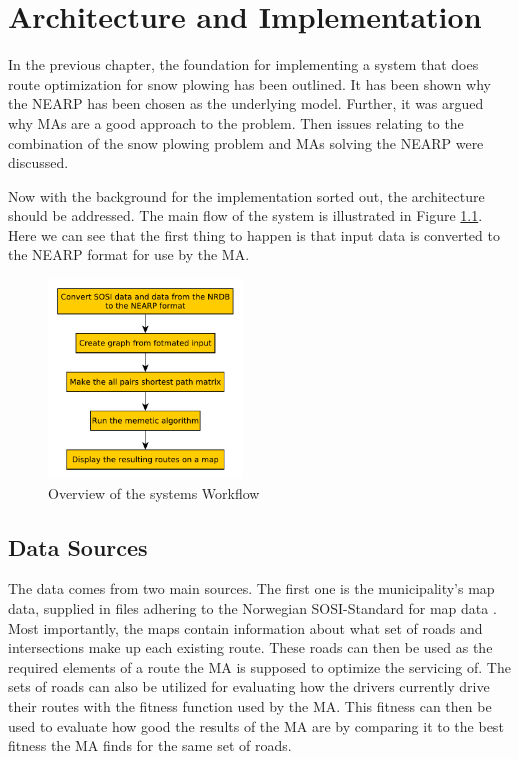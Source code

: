 \chapter{Architecture and Implementation}
\label{architecture_and_implementation}

In the previous chapter, the foundation for implementing a system that does route optimization for snow plowing has been outlined. It has been shown why the NEARP has been chosen as the underlying model. Further, it was argued why MAs are a good approach to the problem. Then issues relating to the combination of the snow plowing problem and MAs solving the NEARP were discussed.

Now with the background for the implementation sorted out, the architecture should be addressed. The main flow of the system is illustrated in Figure \ref{fig:system_flowchart}. Here we can see that the first thing to happen is that input data is converted to the NEARP format \citep{NEARPdocumentationSINTEF} for use by the MA.

\begin{figure}
    \begin{center}
        \includegraphics[width=0.46\textwidth]{figures/Architecture/Overal_system_workflow.pdf}
    \end{center}
    \caption{Overview of the systems Workflow}
    \label{fig:system_flowchart}
\end{figure}

\section{Data Sources} %
\label{sec:data_sources}


The data comes from two main sources. The first one is the municipality's map data, supplied in files adhering to the Norwegian SOSI-Standard for map data \citep{kartverketSOSI}. Most importantly, the maps contain information about what set of roads and intersections make up each existing route. These roads can then be used as the required elements of a route the MA is supposed to optimize the servicing of. The sets of roads can also be utilized for evaluating how the drivers currently drive their routes with the fitness function used by the MA. This fitness can then be used to evaluate how good the results of the MA are by comparing it to the best fitness the MA finds for the same set of roads.

